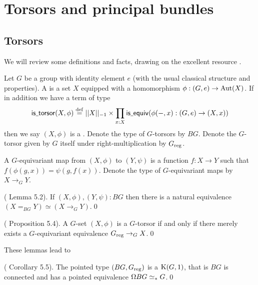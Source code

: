\section{Torsors and principal bundles}
\label{sec:torsors}

\subsection{Torsors}
\label{subsec:torsors}
We will review some definitions and facts, drawing on the excellent resource \cite{buchholtz2023central}.

\begin{mydef}
Let \( G \) be a group with identity element \( e \) (with the usual classical structure and properties). A  is a set \( X \) equipped with a homomorphism \( \phi:(G,e)\to\operatorname{Aut}(X) \). If in addition we have a term of type
\[ 
\mathsf{is\underscore torsor}(X,\phi)\defeq ||X||_{-1}\times \pit{x:X}\mathsf{is\underscore equiv}(\phi(-,x):(G,e)\to (X,x))
\] then we say \( (X,\phi) \) is a . Denote the type of \( G \)-torsors by \( BG \). Denote the \( G \)-torsor given by \( G \) itself under right-multiplication by \( {G}_\mathrm{reg} \).
\end{mydef}

A \( G \)-equivariant map from \( (X,\phi) \) to \( (Y,\psi) \) is a function \( f:X\to Y \) such that \( f(\phi(g,x))=\psi(g,f(x)) \). Denote the type of \( G \)-equivariant maps by \( X\to_G Y \).

\begin{mylemma}
(\cite{buchholtz2023central} Lemma 5.2). If \( (X,\phi),(Y,\psi):BG \) then there is a natural equivalence \( (X=_{BG}Y) \simeq (X\to_G Y) \).\qed
\end{mylemma}

\begin{mylemma}
(\cite{buchholtz2023central} Proposition 5.4). A \( G \)-set \( (X,\phi) \) is a \( G \)-torsor if and only if there merely exists a \( G \)-equivariant equivalence \( {G}_\mathrm{reg}\to_G X \).\qed
\end{mylemma}

These lemmas lead to

\begin{mycor}
(\cite{buchholtz2023central} Corollary 5.5). The pointed type \( (BG,{G}_\mathrm{reg}) \) is a \( \mathrm{K}(G,1) \), that is \( BG \) is connected and has a pointed equivalence \( \Omega BG\simeq_* G \).\qed
\end{mycor}

